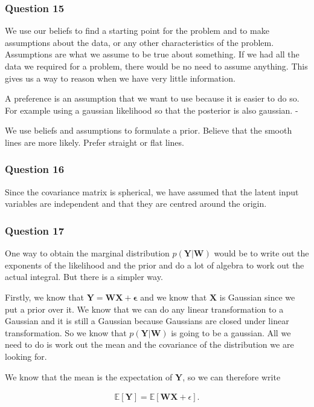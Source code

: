 \documentclass[10pt, a4paper, twocolumn]{article} %
\begin{document}
\subsubsection*{Question 15}
We use our beliefs to find a starting point for the problem and to make assumptions about the data, or any other characteristics of the problem. Assumptions are what we assume to be true about something. If we had all the data we required for a problem, there would be no need to assume anything. This gives us a way to reason when we have very little information. \par
A preference is an assumption that we want to use because it is easier to do so. For example using a gaussian likelihood so that the posterior is also gaussian. -

We use beliefs and assumptions to formulate a prior. Believe that the smooth lines are more likely. Prefer straight or flat lines.

\subsubsection*{Question 16}

Since the covariance matrix is spherical, we have assumed that the latent input variables are independent and that they are centred around the origin. 

\subsubsection*{Question 17}

One way to obtain the marginal distribution $p(\mathbf{Y|W})$ would be to write out the exponents of the likelihood and the prior and do a lot of algebra to work out the actual integral. But there is a simpler way.

Firstly, we know that $\mathbf{Y = WX + \epsilon}$ and we know that $\mathbf{X}$ is Gaussian since we put a prior over it. We know that we can do any linear transformation to a Gaussian and it is still a Gaussian because Gaussians are closed under linear transformation. So we know that $p(\mathbf{Y|W})$ is going to be a gaussian. All we need to do is work out the mean and the covariance of the distribution we are looking for.

We know that the mean is the expectation of $\mathbf{Y}$, so we can therefore write

\begin{align} \label{eq:6}
  \mathbb{E}[\mathbf{Y}] = \mathbb{E}[\mathbf{WX} + \epsilon].
\end{align}
\end{document}
